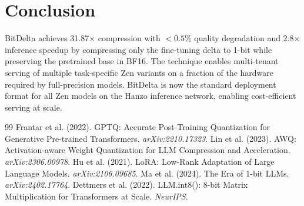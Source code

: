 \documentclass[11pt,a4paper]{article}
\begin{document}
\section{Conclusion}

BitDelta achieves 31.87$\times$ compression with $<0.5\%$ quality degradation and
2.8$\times$ inference speedup by compressing only the fine-tuning delta to 1-bit
while preserving the pretrained base in BF16. The technique enables multi-tenant
serving of multiple task-specific Zen variants on a fraction of the hardware required
by full-precision models. BitDelta is now the standard deployment format for all
Zen models on the Hanzo inference network, enabling cost-efficient serving at scale.


\begin{thebibliography}{99}
 Frantar et al. (2022). GPTQ: Accurate Post-Training Quantization for Generative Pre-trained Transformers. \textit{arXiv:2210.17323}.
 Lin et al. (2023). AWQ: Activation-aware Weight Quantization for LLM Compression and Acceleration. \textit{arXiv:2306.00978}.
 Hu et al. (2021). LoRA: Low-Rank Adaptation of Large Language Models. \textit{arXiv:2106.09685}.
 Ma et al. (2024). The Era of 1-bit LLMs. \textit{arXiv:2402.17764}.
 Dettmers et al. (2022). LLM.int8(): 8-bit Matrix Multiplication for Transformers at Scale. \textit{NeurIPS}.
\end{thebibliography}
\end{document}
